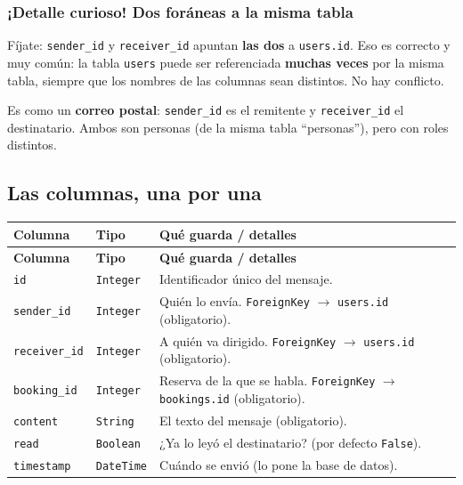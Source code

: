 \documentclass[11pt,a4paper]{article}
\begin{document}
\subsubsection{¡Detalle curioso! Dos foráneas a la \textbf{misma} tabla}

Fíjate: \texttt{sender\_id} y \texttt{receiver\_id} apuntan \textbf{las dos} a \texttt{users.id}.
Eso es correcto y muy común: la tabla \texttt{users} puede ser referenciada \textbf{muchas veces}
por la misma tabla, siempre que los nombres de las columnas sean distintos. No hay conflicto.

\begin{analogia}
Es como un \textbf{correo postal}: \texttt{sender\_id} es el remitente y \texttt{receiver\_id} el
destinatario. Ambos son personas (de la misma tabla ``personas''), pero con roles distintos.
\end{analogia}

\subsection{Las columnas, una por una}

\begin{center}
{\small
\setlength{\tabcolsep}{4pt}
\begin{longtable}{@{}>{\raggedright\arraybackslash}p{3.4cm}>{\raggedright\arraybackslash}p{3cm}>{\raggedright\arraybackslash}p{8.5cm}@{}}
\toprule
\textbf{Columna} & \textbf{Tipo} & \textbf{Qué guarda / detalles} \\
\midrule
\endfirsthead
\toprule
\textbf{Columna} & \textbf{Tipo} & \textbf{Qué guarda / detalles} \\
\midrule
\endhead
\texttt{id} & \texttt{Integer} & Identificador único del mensaje. \\
\texttt{sender\_id} & \texttt{Integer} & Quién lo envía. \texttt{ForeignKey} $\rightarrow$ \texttt{users.id} (obligatorio). \\
\texttt{receiver\_id} & \texttt{Integer} & A quién va dirigido. \texttt{ForeignKey} $\rightarrow$ \texttt{users.id} (obligatorio). \\
\texttt{booking\_id} & \texttt{Integer} & Reserva de la que se habla. \texttt{ForeignKey} $\rightarrow$ \texttt{bookings.id} (obligatorio). \\
\texttt{content} & \texttt{String} & El texto del mensaje (obligatorio). \\
\texttt{read} & \texttt{Boolean} & ¿Ya lo leyó el destinatario? (por defecto \texttt{False}). \\
\texttt{timestamp} & \texttt{DateTime} & Cuándo se envió (lo pone la base de datos). \\
\bottomrule
\end{longtable}
}
\end{center}
\end{document}
